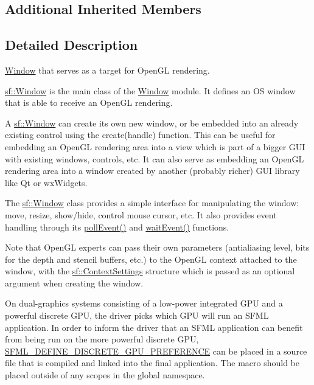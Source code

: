 \subsection*{Additional Inherited Members}


\subsection{Detailed Description}
\mbox{\hyperlink{classsf_1_1_window}{Window}} that serves as a target for Open\+GL rendering. 

\begin{DoxyVerb}\end{DoxyVerb}


\mbox{\hyperlink{classsf_1_1_window}{sf\+::\+Window}} is the main class of the \mbox{\hyperlink{classsf_1_1_window}{Window}} module. It defines an OS window that is able to receive an Open\+GL rendering.

A \mbox{\hyperlink{classsf_1_1_window}{sf\+::\+Window}} can create its own new window, or be embedded into an already existing control using the create(handle) function. This can be useful for embedding an Open\+GL rendering area into a view which is part of a bigger G\+UI with existing windows, controls, etc. It can also serve as embedding an Open\+GL rendering area into a window created by another (probably richer) G\+UI library like Qt or wx\+Widgets.

The \mbox{\hyperlink{classsf_1_1_window}{sf\+::\+Window}} class provides a simple interface for manipulating the window\+: move, resize, show/hide, control mouse cursor, etc. It also provides event handling through its \mbox{\hyperlink{classsf_1_1_window_a338e996585faf82e93069858e3b531b7}{poll\+Event()}} and \mbox{\hyperlink{classsf_1_1_window_aaf02ab64fbc1d374eef3696df54137bc}{wait\+Event()}} functions.

Note that Open\+GL experts can pass their own parameters (antialiasing level, bits for the depth and stencil buffers, etc.) to the Open\+GL context attached to the window, with the \mbox{\hyperlink{structsf_1_1_context_settings}{sf\+::\+Context\+Settings}} structure which is passed as an optional argument when creating the window.

On dual-\/graphics systems consisting of a low-\/power integrated G\+PU and a powerful discrete G\+PU, the driver picks which G\+PU will run an S\+F\+ML application. In order to inform the driver that an S\+F\+ML application can benefit from being run on the more powerful discrete G\+PU, \mbox{\hyperlink{_gpu_preference_8hpp_ab0233c2d867cbd561036ed2440a4fec0}{S\+F\+M\+L\+\_\+\+D\+E\+F\+I\+N\+E\+\_\+\+D\+I\+S\+C\+R\+E\+T\+E\+\_\+\+G\+P\+U\+\_\+\+P\+R\+E\+F\+E\+R\+E\+N\+CE}} can be placed in a source file that is compiled and linked into the final application. The macro should be placed outside of any scopes in the global namespace.

